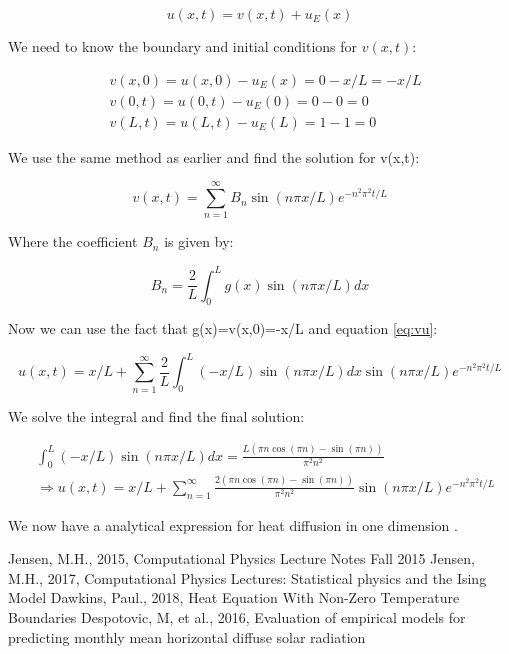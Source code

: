 \documentclass{article}
\begin{document}
\begin{equation}
u(x,t)=v(x,t)+u_E(x)
\label{eq:vu}
\end{equation}

We need to know the boundary and initial conditions for $v(x,t)$:

\begin{equation*}
\begin{split}
&v(x,0)=u(x,0)-u_E(x)=0-x/L=-x/L\\
&v(0,t)=u(0,t)-u_E(0)=0-0=0\\
&v(L,t)=u(L,t)-u_E(L)=1-1=0
\end{split}
\end{equation*}
 
 We use the same method as earlier and find the solution for v(x,t):
 
 \begin{equation}
v(x,t) = \sum_{n=1}^{\infty}B_n\sin{(n\pi x/L)}e^{-n^2\pi^2t/L}
\end{equation}
 
Where the coefficient $B_n$ is given by:

\begin{equation}
B_n=\frac{2}{L}\int_0^Lg(x)\sin{(n\pi x/L)} dx
\end{equation}

Now we can use the fact that g(x)=v(x,0)=-x/L and equation \ref{eq:vu}:

\begin{equation}
u(x,t)=x/L+\sum_{n=1}^{\infty}\frac{2}{L}\int_0^L(-x/L)\sin{(n\pi x/L)} dx\sin{(n\pi x/L)}e^{-n^2\pi^2t/L}
\end{equation}

We solve the integral and find the final solution:

\begin{equation*}
\begin{split}
&\int_0^L(-x/L)\sin{(n\pi x/L)} dx=\frac{L(\pi n \cos{(\pi n)}-\sin{(\pi n)})}{\pi^2n^2}\\
&\Rightarrow u(x,t)=x/L+\sum_{n=1}^{\infty}\frac{2(\pi n \cos{(\pi n)}-\sin{(\pi n)})}{\pi^2n^2}\sin{(n\pi x/L)}e^{-n^2\pi^2t/L}
\end{split}
\end{equation*}

We now have a analytical expression for heat diffusion in one dimension \cite{94}\cite{96}. 


\begin{thebibliography}{9}
	Jensen, M.H., 2015, Computational Physics Lecture Notes Fall 2015
	Jensen, M.H., 2017, Computational Physics Lectures: Statistical physics and the Ising Model
	Dawkins, Paul., 2018, Heat Equation With Non-Zero Temperature Boundaries
	Despotovic, M, et al., 2016, Evaluation of empirical models for predicting monthly mean horizontal diffuse solar radiation
	
\end{thebibliography}
\end{document}
